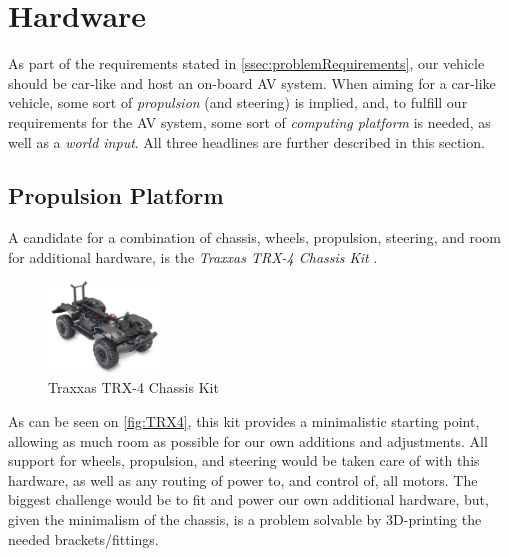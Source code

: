 \section{Hardware}\label{sec:optimalHardware}
As part of the requirements stated in \autoref{ssec:problemRequirements}, our vehicle should be car-like and host an on-board AV system.
When aiming for a car-like vehicle, some sort of \textit{propulsion} (and steering) is implied, and, to fulfill our requirements for the AV system, some sort of \textit{computing platform} is needed, as well as a \textit{world input}.
All three headlines are further described in this section.

\subsection{Propulsion Platform}\label{ssec:optimalHardwarePropulsion}
A candidate for a combination of chassis, wheels, propulsion, steering, and room for additional hardware, is the \textit{Traxxas TRX-4 Chassis Kit} \cite{TraxxasTRX4}.
\begin{figure}[H]
  \centering
  \includegraphics[width=3cm]{images/techAnalysis/TRX4.jpg}
  \caption{Traxxas TRX-4 Chassis Kit}
  \label{fig:TRX4}
\end{figure}
As can be seen on \autoref{fig:TRX4}, this kit provides a minimalistic starting point, allowing as much room as possible for our own additions and adjustments.
All support for wheels, propulsion, and steering would be taken care of with this hardware, as well as any routing of power to, and control of, all motors.
The biggest challenge would be to fit and power our own additional hardware, but, given the minimalism of the chassis, is a problem solvable by 3D-printing the needed brackets/fittings.

